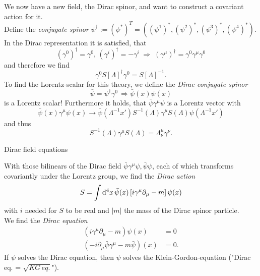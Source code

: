 We now have a new field, the Dirac spinor, and want to construct a covariant action for it.\\
Define the \emph{conjugate spinor}
 $\psi^{\dagger} := (\psi^*)^T= \left((\psi^1)^*, (\psi^2)^*, (\psi^3)^*, (\psi^4)^* \right)$. In the Dirac representation it is satisfied, that
 \begin{equation}
 	(\gamma^0)^{\dagger} = \gamma^0, \, (\gamma^i)^{\dagger} = - \gamma^i \; \Rightarrow \; (\gamma^{\mu})^{\dagger} = \gamma^0 \gamma^{\mu} \gamma^0
 \end{equation}
 and therefore we find
 \begin{equation}
 	\gamma^0 S[\Lambda]^{\dagger} \gamma^0 = S[\Lambda]^{-1}.
 \end{equation}
 To find the Lorentz-scalar for this theory, we define the \emph{Dirac conjugate spinor}
 \begin{equation}
 	\bar{\psi} = \psi^{\dagger} \gamma^0 \, \Rightarrow \bar{\psi} (x) \psi(x) 
 \end{equation}
 is a Lorentz scalar! Furthermore it holds, that $\bar{\psi} \gamma^{\mu} \psi$ is a Lorentz vector with 
 \begin{equation}
 	\bar{\psi} (x) \gamma^{\mu} \psi(x) \rightarrow \bar{\psi}(\Lambda^{-1} x') S^{-1}(\Lambda) \gamma^{\mu} S(\Lambda) \psi(\Lambda^{-1} x' )
 \end{equation}
 and thus
 \begin{equation}
 	S^{-1} (\Lambda) \gamma^{\mu} S(\Lambda) = \Lambda^{\mu}_{\nu} \gamma^{\nu}.
 \end{equation}
 \begin{mybox}{Dirac field equations}

With those bilinears of the Dirac field $\bar{\psi} \gamma^{\mu} \psi, \bar{\psi} \psi$, each of which transforms covariantly under the Lorentz group, we find the 
\emph{Dirac action}
\begin{equation}
	S = \int \mathrm{d}^4 x \, \bar{\psi}(x) \left[i \gamma^{\mu} \partial_{\mu} - m\right] \psi(x)
\end{equation}
with $i$ needed for $S$ to be real and $|m|$ the mass of the Dirac spinor particle.\\
We find the \emph{Dirac equation}
\begin{align}
	\left(i \gamma^{\mu} \partial_{\mu} - m\right) \psi(x) &= 0\\
	\left(-i \partial_{\mu} \bar{\psi} \gamma^{\mu} - m \bar{\psi} \right)(x) &= 0.
\end{align}
If $\psi$ solves the Dirac equation, then $\psi$ solves the Klein-Gordon-equation ("Dirac eq. = $\sqrt{KG \, eq.}$").
 \end{mybox}
